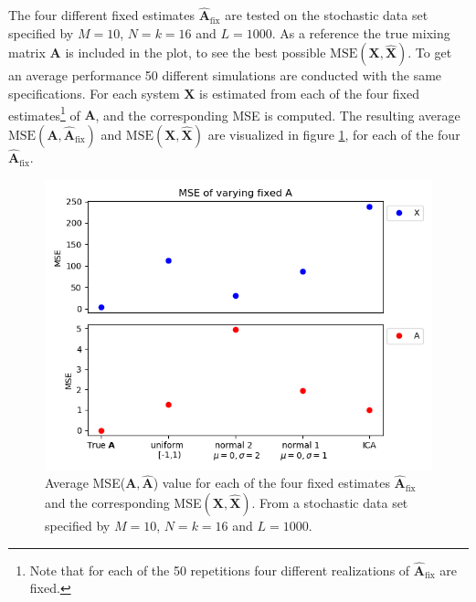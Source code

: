 The four different fixed estimates $\hat{\mathbf{A}}_{\text{fix}}$ are tested on the stochastic data set specified by $M = 10$, $N = k = 16$ and $L = 1000$. 
As a reference the true mixing matrix $\mathbf{A}$ is included in the plot, to see the best possible $\text{MSE}(\mathbf{X}, \hat{\mathbf{X}})$.
To get an average performance 50 different simulations are conducted with the same specifications. For each system $\mathbf{X}$ is estimated from each of the four fixed estimates\footnote{Note that for each of the 50 repetitions four different realizations of $\hat{\mathbf{A}}_{\text{fix}}$ are fixed.} of $\mathbf{A}$, and the corresponding MSE is computed. 
The resulting average $\text{MSE}(\mathbf{A}, \hat{\mathbf{A}}_{\text{fix}})$ and $\text{MSE}(\mathbf{X}, \hat{\mathbf{X}})$ are visualized in figure \ref{fig:vary_A}, for each of the four $\hat{\mathbf{A}}_{\text{fix}}$. 
\begin{figure}[H]
\centering
\includegraphics[scale=0.5]{figures/ch_6/A_fix1.png}
\caption{Average MSE($\textbf{A},\hat{\mathbf{A}}$) value for each of the four fixed estimates $\hat{\mathbf{A}}_{\text{fix}}$ and the corresponding MSE$(\textbf{X},\hat{\mathbf{X}})$. From a stochastic data set specified by $M = 10$, $N = k = 16$ and $L = 1000$.}
\label{fig:vary_A}
\end{figure}
\noindent
%
